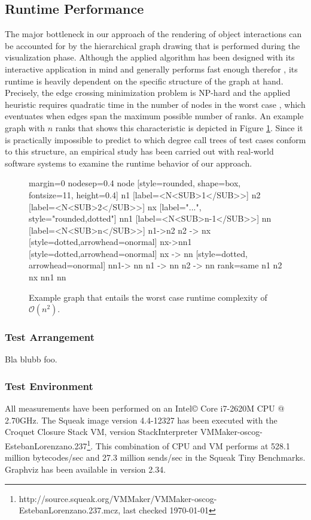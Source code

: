 \subsection{Runtime Performance}
\label{ss:DiscussionPerformance}
The major bottleneck in our approach of the rendering of object interactions can be accounted for by the hierarchical graph drawing that is performed during the visualization phase.
Although the applied algorithm has been designed with its interactive application in mind and generally performs fast enough therefor \cite{gansner_technique_1993}, its runtime is heavily dependent on the specific structure of the graph at hand.
Precisely, the edge crossing minimization problem is NP-hard and the applied heuristic requires quadratic time in the number of nodes in the worst case \cite{tamassia_handbook_2013}, which eventuates when edges span the maximum possible number of ranks.
An example graph with $n$ ranks that shows this characteristic is depicted in Figure \ref{fig:graph-worst-case}.
Since it is practically impossible to predict to which degree call trees of test cases conform to this structure, an empirical study has been carried out with real-world software systems to examine the runtime behavior of our approach.

\begin{figure}[tb]
	\centering	
	{
		margin=0
		nodesep=0.4
		node [style=rounded, shape=box, fontsize=11, height=0.4]
		n1 [label=<N<SUB>1</SUB>>]
		n2 [label=<N<SUB>2</SUB>>]
		nx [label="...", style="rounded,dotted"]
		nn1 [label=<N<SUB>n-1</SUB>>]
		nn [label=<N<SUB>n</SUB>>]
		n1->n2
		n2 -> nx [style=dotted,arrowhead=onormal]
		nx->nn1 [style=dotted,arrowhead=onormal]
		nx -> nn [style=dotted, arrowhead=onormal]
		nn1-> nn
		n1 -> nn
		n2 -> nn
		{rank=same n1 n2 nx nn1 nn}
	}
	\caption[Example Graph that Entails Worst Case Runtime Complexity]{Example graph that entails the worst case runtime complexity of $\mathcal O(n^2)$.}
	\label{fig:graph-worst-case}
\end{figure}

\subsubsection{Test Arrangement}
Bla blubb foo.

\subsubsection{Test Environment}
All measurements have been performed on an Intel\copyright{} Core\texttrademark{}  i7-2620M CPU @ 2.70GHz.
The Squeak image version 4.4-12327 has been executed with the Croquet Closure Stack VM, version StackInterpreter VMMaker-oscog-EstebanLorenzano.237\footnote{http://source.squeak.org/VMMaker/VMMaker-oscog-EstebanLorenzano.237.mcz, last checked \today}. 
This combination of CPU and VM performs at 528.1 million bytecodes/sec and 27.3 million sends/sec in the Squeak Tiny Benchmarks. Graphviz has been available in version 2.34.

